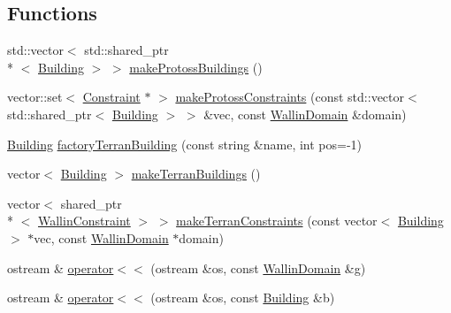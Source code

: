 \subsection*{Functions}
\begin{DoxyCompactItemize}
\item 
std\-::vector$<$ std\-::shared\-\_\-ptr\\*
$<$ \hyperlink{classghost_1_1Building}{Building} $>$ $>$ \hyperlink{namespaceghost_af3e32bb59f07ee561580978affe544bd}{make\-Protoss\-Buildings} ()
\item 
vector\-::set$<$ \hyperlink{classghost_1_1Constraint}{Constraint} $\ast$ $>$ \hyperlink{namespaceghost_a876b814af945577733c112c82d0423c3}{make\-Protoss\-Constraints} (const std\-::vector$<$ std\-::shared\-\_\-ptr$<$ \hyperlink{classghost_1_1Building}{Building} $>$ $>$ \&vec, const \hyperlink{classghost_1_1WallinDomain}{Wallin\-Domain} \&domain)
\item 
\hyperlink{classghost_1_1Building}{Building} \hyperlink{namespaceghost_a797dd3167189ccc913156ff624a7ad6a}{factory\-Terran\-Building} (const string \&name, int pos=-\/1)
\item 
vector$<$ \hyperlink{classghost_1_1Building}{Building} $>$ \hyperlink{namespaceghost_ade7cf14b6b46de3b038be9fb6c8afd82}{make\-Terran\-Buildings} ()
\item 
vector$<$ shared\-\_\-ptr\\*
$<$ \hyperlink{classghost_1_1WallinConstraint}{Wallin\-Constraint} $>$ $>$ \hyperlink{namespaceghost_af7fa3891f5f6563a142a99d3ab6b604b}{make\-Terran\-Constraints} (const vector$<$ \hyperlink{classghost_1_1Building}{Building} $>$ $\ast$vec, const \hyperlink{classghost_1_1WallinDomain}{Wallin\-Domain} $\ast$domain)
\item 
ostream \& \hyperlink{namespaceghost_a324a8e116f71d2eee57a356671330cc1}{operator$<$$<$} (ostream \&os, const \hyperlink{classghost_1_1WallinDomain}{Wallin\-Domain} \&g)
\item 
ostream \& \hyperlink{namespaceghost_a1e7e02c276d52eda961d841a47211933}{operator$<$$<$} (ostream \&os, const \hyperlink{classghost_1_1Building}{Building} \&b)
\end{DoxyCompactItemize}
